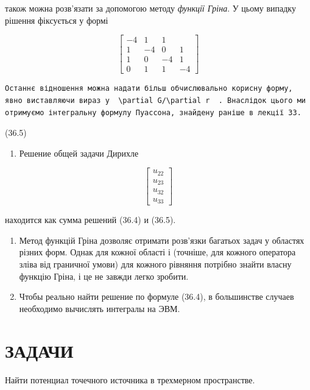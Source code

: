 \documentclass[
  ukrainian,
]{article}
\providecommand{\tightlist}{%
  \setlength{\itemsep}{0pt}\setlength{\parskip}{0pt}}
\begin{document}
також можна розв'язати за допомогою методу \emph{функції Гріна}. У цьому
випадку рішення фіксується у формі

\[
\begin{bmatrix} -4 & 1 & 1 \\ 1 & -4 & 0 & 1 \\ 1 & 0 & -4 & 1 \\ 0 & 1 & 1 & -4 \end{bmatrix}
\]

\begin{verbatim}
Останнє відношення можна надати більш обчислювально корисну форму, явно виставляючи вираз у  \partial G/\partial r  . Внаслідок цього ми отримуємо інтегральну формулу Пуассона, знайдену раніше в лекції 33.
\end{verbatim}

(36.5)

\begin{enumerate}
\def\labelenumi{\arabic{enumi}.}
\setcounter{enumi}{1}
\tightlist
\item
  Решение общей задачи Дирихле
\end{enumerate}

\[
\begin{bmatrix} u_{22} \\ u_{23} \\ u_{32} \\ u_{33} \end{bmatrix}
\]

находится как сумма решений (36.4) и (36.5).

\begin{enumerate}
\def\labelenumi{\arabic{enumi}.}
\setcounter{enumi}{2}
\item
  Метод функцій Гріна дозволяє отримати розв'язки багатьох задач у
  областях різних форм. Однак для кожної області і (точніше, для кожного
  оператора зліва від граничної умови) для кожного рівняння потрібно
  знайти власну функцію Гріна, і це не завжди легко зробити.
\item
  Чтобы реально найти решение по формуле (36.4), в большинстве случаев
  необходимо вычислять интегралы на ЭВМ.
\end{enumerate}

\section{ЗАДАЧИ}\label{ux437ux430ux434ux430ux447ux438-4}

Найти потенциал точечного источника в трехмерном пространстве.
\end{document}
